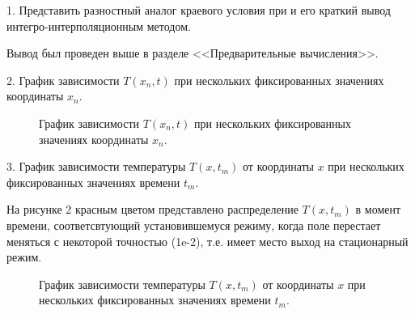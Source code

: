\documentclass[a4paper,14pt]{article}
\begin{document}
1. Представить разностный аналог краевого условия при  и его краткий вывод интегро-интерполяционным методом.

Вывод был проведен выше в разделе <<Предварительные вычисления>>.

2. График зависимости $T(x_n, t)$ при нескольких
фиксированных значениях координаты $x_n$.

\begin{figure}[!h]
	\caption{График зависимости $T(x_n, t)$ при нескольких
	фиксированных значениях координаты $x_n$.}
	\label{fig:image}
\end{figure}

3. График зависимости температуры $T(x, t_m)$ от координаты
$x$ при нескольких фиксированных значениях времени $t_m$.

На рисунке 2 красным цветом представлено распределение
$T(x, t_m)$ в момент времени, соответсвтующий
установившемуся режиму, когда поле перестает меняться с
некоторой точностью (1e-2), т.е. имеет место выход на стационарный режим.


\begin{figure}[!h]
	\caption{График зависимости температуры $T(x, t_m)$ от координаты
	$x$ при нескольких фиксированных значениях времени $t_m$.}
	\label{fig:image}
\end{figure}
\end{document}
